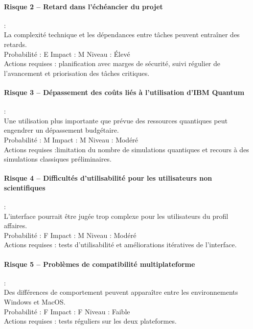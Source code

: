 \documentclass[11pt]{article}
\begin{document}
\paragraph{Risque 2 – Retard dans l’échéancier du projet} :\\
La complexité technique et les dépendances entre tâches peuvent entraîner des retards.\\
Probabilité : E \quad Impact : M \quad Niveau : Élevé \\
Actions requises : planification avec marges de sécurité, suivi régulier de l’avancement et priorisation des tâches critiques.

\paragraph{Risque 3 – Dépassement des coûts liés à l’utilisation d’IBM Quantum} :\\
Une utilisation plus importante que prévue des ressources quantiques peut engendrer un dépassement budgétaire.\\
Probabilité : M \quad Impact : M \quad Niveau : Modéré \\
Actions requises :limitation du nombre de simulations quantiques et recours à des simulations classiques préliminaires.

\paragraph{Risque 4 – Difficultés d’utilisabilité pour les utilisateurs non scientifiques} :\\
L’interface pourrait être jugée trop complexe pour les utilisateurs du profil affaires.\\
Probabilité : F \quad Impact : M \quad Niveau : Modéré \\
Actions requises : tests d’utilisabilité et améliorations itératives de l’interface.

\paragraph{Risque 5 – Problèmes de compatibilité multiplateforme} :\\
Des différences de comportement peuvent apparaître entre les environnements Windows et MacOS.\\
Probabilité : F \quad Impact : F \quad Niveau : Faible \\
Actions requises : tests réguliers sur les deux plateformes.
\end{document}
